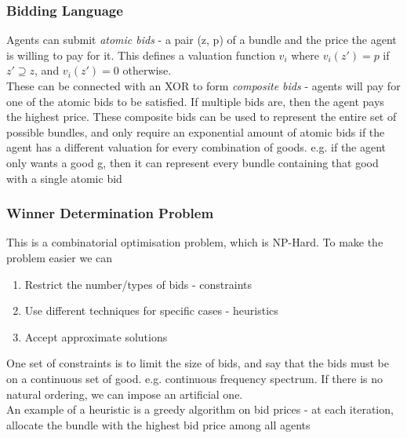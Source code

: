 \subsubsection{Bidding Language}
Agents can submit \emph{atomic bids} - a pair (z, p) of a bundle and the price the agent is willing to pay for it. This defines a valuation function $v_i$ where $v_i(z') = p$ if $z'\supseteq z$, and $v_i(z') = 0$ otherwise.\\
These can be connected with an XOR to form \emph{composite bids} - agents will pay for one of the atomic bids to be satisfied. If multiple bids are, then the agent pays the highest price. These composite bids can be used to represent the entire set of possible bundles, and only require an exponential amount of atomic bids if the agent has a different valuation for every combination of goods. e.g. if the agent only wants a good g, then it can represent every bundle containing that good with a single atomic bid

\subsubsection{Winner Determination Problem}
This is a combinatorial optimisation problem, which is NP-Hard. To make the problem easier we can
\begin{enumerate}
    \item Restrict the number/types of bids - constraints
    \item Use different techniques for specific cases - heuristics
    \item Accept approximate solutions
\end{enumerate}
One set of constraints is to limit the size of bids, and say that the bids must be on a continuous set of good. e.g. continuous frequency spectrum. If there is no natural ordering, we can impose an artificial one.\\
An example of a heuristic is a greedy algorithm on bid prices - at each iteration, allocate the bundle with the highest bid price among all agents

